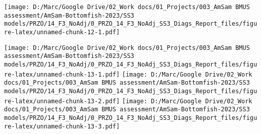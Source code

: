 \documentclass[
]{article}
\begin{document}
\texttt{[image: D:/Marc/Google Drive/02\_Work docs/01\_Projects/003\_AmSam BMUS assessment/AmSam-Bottomfish-2023/SS3 models/PRZO/14\_F3\_NoAdj/0\_PRZO\_14\_F3\_NoAdj\_SS3\_Diags\_Report\_files/figure-latex/unnamed-chunk-12-1.pdf]}

\texttt{[image: D:/Marc/Google Drive/02\_Work docs/01\_Projects/003\_AmSam BMUS assessment/AmSam-Bottomfish-2023/SS3 models/PRZO/14\_F3\_NoAdj/0\_PRZO\_14\_F3\_NoAdj\_SS3\_Diags\_Report\_files/figure-latex/unnamed-chunk-13-1.pdf]}
\texttt{[image: D:/Marc/Google Drive/02\_Work docs/01\_Projects/003\_AmSam BMUS assessment/AmSam-Bottomfish-2023/SS3 models/PRZO/14\_F3\_NoAdj/0\_PRZO\_14\_F3\_NoAdj\_SS3\_Diags\_Report\_files/figure-latex/unnamed-chunk-13-2.pdf]}
\texttt{[image: D:/Marc/Google Drive/02\_Work docs/01\_Projects/003\_AmSam BMUS assessment/AmSam-Bottomfish-2023/SS3 models/PRZO/14\_F3\_NoAdj/0\_PRZO\_14\_F3\_NoAdj\_SS3\_Diags\_Report\_files/figure-latex/unnamed-chunk-13-3.pdf]}

\hypertarget{section}{%
\subsection{}\label{section}}
\end{document}
